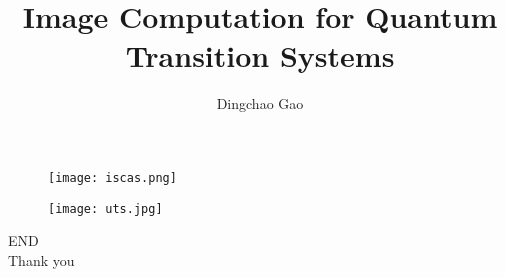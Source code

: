 \documentclass[aspectratio=1610]{beamer}
\title[TDD in quantum]{Image Computation for Quantum Transition Systems}
\author[Gcc]{Dingchao Gao}
\begin{document}
\begin{frame}[plain]
  \titlepage
  \begin{figure}
    \centering
    \begin{minipage}[t]{0.48\textwidth}
    \centering
    \texttt{[image: iscas.png]}
    \end{minipage}
    \begin{minipage}[t]{0.48\textwidth}
    \centering
    \texttt{[image: uts.jpg]}
    \end{minipage}
  \end{figure}
\end{frame}

\begin{frame}
\centering
\Huge{END\\Thank you}
\end{frame}
\end{document}

